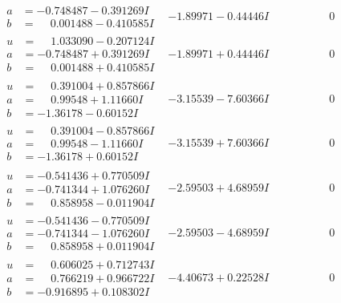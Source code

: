 \documentclass[1p]{elsarticle_modified}
\theoremstyle{definition}
\begin{document}
$$\begin{array}{c|c|c}
\begin{aligned}
a &= -0.748487 - 0.391269 I \\
b &= \phantom{-}0.001488 - 0.410585 I\end{aligned}
 & -1.89971 - 0.44446 I & \phantom{-0.000000 } 0 \\ \hline\begin{aligned}
u &= \phantom{-}1.033090 - 0.207124 I \\
a &= -0.748487 + 0.391269 I \\
b &= \phantom{-}0.001488 + 0.410585 I\end{aligned}
 & -1.89971 + 0.44446 I & \phantom{-0.000000 } 0 \\ \hline\begin{aligned}
u &= \phantom{-}0.391004 + 0.857866 I \\
a &= \phantom{-}0.99548 + 1.11660 I \\
b &= -1.36178 - 0.60152 I\end{aligned}
 & -3.15539 - 7.60366 I & \phantom{-0.000000 } 0 \\ \hline\begin{aligned}
u &= \phantom{-}0.391004 - 0.857866 I \\
a &= \phantom{-}0.99548 - 1.11660 I \\
b &= -1.36178 + 0.60152 I\end{aligned}
 & -3.15539 + 7.60366 I & \phantom{-0.000000 } 0 \\ \hline\begin{aligned}
u &= -0.541436 + 0.770509 I \\
a &= -0.741344 + 1.076260 I \\
b &= \phantom{-}0.858958 - 0.011904 I\end{aligned}
 & -2.59503 + 4.68959 I & \phantom{-0.000000 } 0 \\ \hline\begin{aligned}
u &= -0.541436 - 0.770509 I \\
a &= -0.741344 - 1.076260 I \\
b &= \phantom{-}0.858958 + 0.011904 I\end{aligned}
 & -2.59503 - 4.68959 I & \phantom{-0.000000 } 0 \\ \hline\begin{aligned}
u &= \phantom{-}0.606025 + 0.712743 I \\
a &= \phantom{-}0.766219 + 0.966722 I \\
b &= -0.916895 + 0.108302 I\end{aligned}
 & -4.40673 + 0.22528 I & \phantom{-0.000000 } 0 \\ \hline\begin{aligned}

\end{aligned}
\end{array}$$
\end{document}
